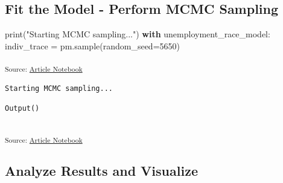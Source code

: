 \documentclass[
]{agujournal2019}
\newenvironment{Shaded}{\begin{snugshade}}{\end{snugshade}}
\newcommand{\BuiltInTok}[1]{\textcolor[rgb]{0.00,0.23,0.31}{#1}}
\newcommand{\ControlFlowTok}[1]{\textcolor[rgb]{0.00,0.23,0.31}{\textbf{#1}}}
\newcommand{\DecValTok}[1]{\textcolor[rgb]{0.68,0.00,0.00}{#1}}
\newcommand{\NormalTok}[1]{\textcolor[rgb]{0.00,0.23,0.31}{#1}}
\newcommand{\OperatorTok}[1]{\textcolor[rgb]{0.37,0.37,0.37}{#1}}
\newcommand{\StringTok}[1]{\textcolor[rgb]{0.13,0.47,0.30}{#1}}
\begin{document}
\subsection{Fit the Model - Perform MCMC
Sampling}\label{fit-the-model---perform-mcmc-sampling}

\begin{Shaded}
\begin{Highlighting}[]
\BuiltInTok{print}\NormalTok{(}\StringTok{"Starting MCMC sampling..."}\NormalTok{)}
\ControlFlowTok{with}\NormalTok{ unemployment\_race\_model:}
\NormalTok{    indiv\_trace }\OperatorTok{=}\NormalTok{ pm.sample(random\_seed}\OperatorTok{=}\DecValTok{5650}\NormalTok{)}
\end{Highlighting}
\end{Shaded}

\textsubscript{Source:
\href{https://mw1296.github.io/dsan5650_social_causal_inference/index.qmd.html}{Article
Notebook}}

\begin{verbatim}
Starting MCMC sampling...
\end{verbatim}

\begin{verbatim}
Output()
\end{verbatim}

\begin{verbatim}
\end{verbatim}

\textsubscript{Source:
\href{https://mw1296.github.io/dsan5650_social_causal_inference/index.qmd.html}{Article
Notebook}}

\subsection{Analyze Results and
Visualize}\label{analyze-results-and-visualize}
\end{document}
